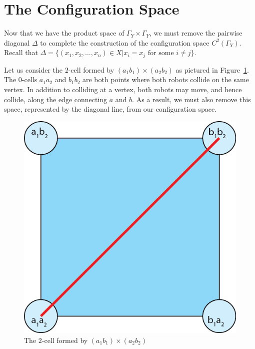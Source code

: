 \documentclass{amsart}
\newcommand{\Y}{\Gamma_Y}
\begin{document}
\newpage

\newpage
\section{The Configuration Space}

Now that we have the product space of $\Y \times \Y$, we must remove the pairwise diagonal $\Delta$ to complete the construction of the configuration space $C^2(\Y)$. Recall that $\Delta = \{(x_1,x_2,\dots, x_n)\in X | x_i = x_j\text{ for some } i \neq j\}$.

Let us consider the $2$-cell formed by $(a_1b_1)\times (a_2b_2)$ as pictured in Figure~\ref{fig:twosaywhat}. The $0$-cells $a_1a_2$ and $b_1b_2$ are both points where both robots collide on the same vertex. In addition to colliding at a vertex, both robots may move, and hence collide, along the edge connecting $a$ and $b$. As a result, we must also remove this space, represented by the diagonal line, from our configuration space. 

\begin{figure}[h]
\caption{The $2$-cell formed by $(a_1b_1)\times (a_2b_2)$ }\label{fig:twosaywhat}
\centering
\hspace{.5in}
\includegraphics[scale=.3]{Export.png}
\end{figure}
\end{document}

